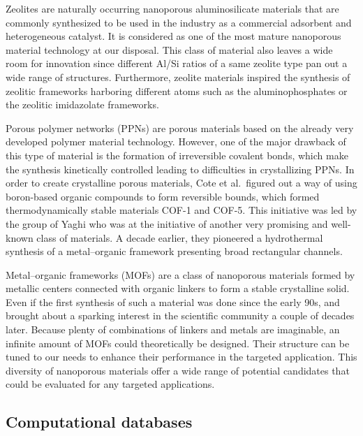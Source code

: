 \documentclass[main.tex]{subfiles}
\begin{document}
Zeolites are naturally occurring nanoporous aluminosilicate materials that are commonly synthesized to be used in the industry as a commercial adsorbent and heterogeneous catalyst.\autocite{Ozin_1989,Ma_2000} It is considered as one of the most mature nanoporous material technology at our disposal. This class of material also leaves a wide room for innovation since different Al/Si ratios of a same zeolite type pan out a wide range of structures. Furthermore, zeolite materials inspired the synthesis of zeolitic frameworks harboring different atoms such as the aluminophosphates or the zeolitic imidazolate frameworks.\autocite{Wang_2012,Chen_2014_zeo} 

Porous polymer networks (PPNs) are porous materials based on the already very developed polymer material technology.\autocite{Lu_2010,Wang_2020,Che_2020} However, one of the major drawback of this type of material is the formation of irreversible covalent bonds, which make the synthesis kinetically controlled leading to difficulties in crystallizing PPNs.\autocite{Feng_2012} In order to create crystalline porous materials, Cote et al.\ figured out a way of using boron-based organic compounds to form reversible bounds, which formed thermodynamically stable materials COF-1 and COF-5.\autocite{Cote_2005} This initiative was led by the group of Yaghi who was at the initiative of another very promising and well-known class of materials. A decade earlier,  they pioneered a hydrothermal synthesis of a metal--organic framework presenting broad rectangular channels.\autocite{Yaghi_1995} 

Metal--organic frameworks (MOFs) are a class of nanoporous materials formed by metallic centers connected with organic linkers to form a stable crystalline solid. Even if the first synthesis of such a material was done since the early 90s,\autocite{Abrahams_1991} and brought about a sparking interest in the scientific community a couple of decades later.\autocite{Kuppler_2009,Furukawa_2013} Because plenty of combinations of linkers and metals are imaginable, an infinite amount of MOFs could theoretically be designed. Their structure can be tuned to our needs to enhance their performance in the targeted application.\autocite{Ejsmont_2021} This diversity of nanoporous materials offer a wide range of potential candidates that could be evaluated for any targeted applications. 


\subsection{Computational databases}
\end{document}
